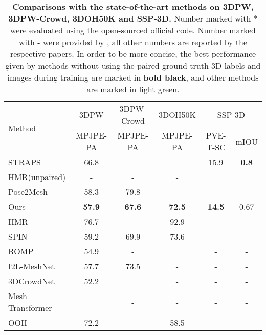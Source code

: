 \documentclass[journal]{IEEEtran}
\begin{document}
\begin{table*}[htbp]
\caption{\textbf{Comparisons with the state-of-the-art methods on 3DPW, 3DPW-Crowd, 3DOH50K and SSP-3D.} Number marked with * were evaluated using the open-sourced official code. Number marked with - were provided by \cite{STRAPS2020BMVC}, all other numbers are reported by the respective papers. In order to be more concise, the best performance given by methods without using the paired ground-truth 3D labels and images during training are marked in \textbf{bold black}, and other methods are marked in {\color[HTML]{32CB16}light green}.}
\begin{center}
\begin{tabular}{lccccc} 
\toprule
\multirow{2}{*}{Method}      & 3DPW          & 3DPW-Crowd & 3DOH50K   & \multicolumn{2}{c}{SSP-3D}  \\
                             & MPJPE-PA              & MPJPE-PA           & MPJPE-PA           & PVE-T-SC                          &mIOU                               \\ 
\hline
STRAPS \cite{STRAPS2020BMVC}                     & 66.8                  &             &               & 15.9                              & \textbf{0.8}                       \\
HMR(unpaired) \cite{kanazawa2018end}            & -                     & -                  & -                  &                         &                          \\
Pose2Mesh \cite{Choi_2020_ECCV_Pose2Mesh}   & 58.3 &79.8               & - & -                & -                 \\
Ours                         & \textbf{57.9}         & \textbf{67.6}     & \textbf{72.5}      & \textbf{14.5}                     & 0.67                               \\ 
\hline
HMR   \cite{kanazawa2018end}                       & 76.7                  & -                  & 92.9               &                         &                          \\
SPIN \cite{kolotouros2019spin}                        & 59.2                  & 69.9               & 73.6               &  &   \\
ROMP   \cite{ROMP}                      & 54.9                  & -                  &                & -                                 & -                                  \\

I2L-MeshNet \cite{Moon_2020_ECCV_I2L-MeshNet} & 57.7 & 73.5               & - & -               & -                 \\
3DCrowdNet \cite{choi20213dcrowdnet}  & 52.2 &               &- & -                & -               \\
Mesh Transformer \cite{lin2021end-to-end}  & & -               & - & -                & -              \\
OOH\cite{zhang2020object}                          & 72.2                  & -                                   & 58.5               & -                                 & -                                  \\
\bottomrule
\end{tabular}



\end{center}
\end{table*}
\end{document}
